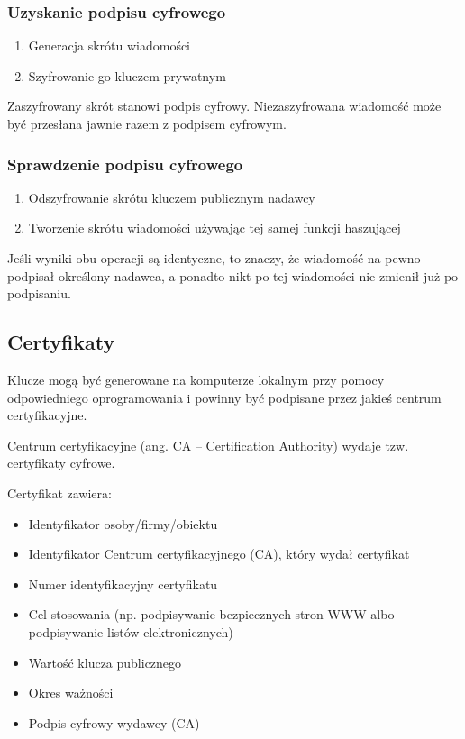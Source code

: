 \documentclass[main.tex]{subfiles}
\begin{document}
    \subsubsection{Uzyskanie podpisu cyfrowego}
    \begin{enumerate}
        \item Generacja skrótu wiadomości
        \item Szyfrowanie go kluczem prywatnym
    \end{enumerate}

    Zaszyfrowany skrót stanowi podpis cyfrowy.
    Niezaszyfrowana wiadomość może być przesłana jawnie razem z podpisem cyfrowym.

    \subsubsection{Sprawdzenie podpisu cyfrowego}
    \begin{enumerate}
        \item Odszyfrowanie skrótu kluczem publicznym nadawcy
        \item Tworzenie skrótu wiadomości używając tej samej funkcji haszującej
    \end{enumerate}

    Jeśli wyniki obu operacji są identyczne, to znaczy, że wiadomość na pewno
    podpisał określony nadawca, a ponadto nikt po tej wiadomości nie zmienił już po podpisaniu.



    \subsection{Certyfikaty}

    Klucze mogą być generowane na komputerze lokalnym przy pomocy odpowiedniego oprogramowania i powinny być podpisane przez jakieś centrum certyfikacyjne.

    Centrum certyfikacyjne (ang. CA – Certification Authority) wydaje tzw. certyfikaty cyfrowe.

    Certyfikat zawiera:
    \begin{itemize}
        \item Identyfikator osoby/firmy/obiektu
        \item Identyfikator Centrum certyfikacyjnego (CA), który wydał certyfikat
        \item Numer identyfikacyjny certyfikatu
        \item Cel stosowania (np. podpisywanie bezpiecznych stron WWW albo podpisywanie listów elektronicznych)
        \item Wartość klucza publicznego
        \item Okres ważności
        \item Podpis cyfrowy wydawcy (CA)
    \end{itemize}
\end{document}
